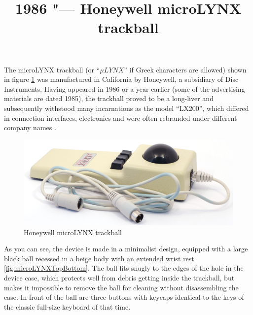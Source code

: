 \documentclass[11pt, a4paper]{article}
\begin{document}
\title{1986 "--- Honeywell microLYNX trackball}
\date{}
\maketitle
{}
The microLYNX trackball (or “$\mu LYNX$” if Greek characters are allowed) shown in figure \ref{fig:microLYNXPic} was manufactured in California by Honeywell, a subsidiary of Disc Instruments. Having appeared in 1986 or a year earlier (some of the advertising materials are dated 1985), the trackball proved to be a long-liver and subsequently withstood many incarnations as the model “LX200”, which differed in connection interfaces, electronics and were often rebranded under different company names \cite{lx200}.

\begin{figure}[h]
    \centering
    \includegraphics[scale=0.45]{1986_honeywell_microlynx_trackball/pic_30.jpg}
    \caption{Honeywell microLYNX trackball}
    \label{fig:microLYNXPic}
\end{figure}

As you can see, the device is made in a minimalist design, equipped with a large black ball recessed in a beige body with an extended wrist rest \ref{fig:microLYNXTopBottom}. The ball fits snugly to the edges of the hole in the device case, which protects well from debris getting inside the trackball, but makes it impossible to remove the ball for cleaning without disassembling the case. In front of the ball are three buttons with keycaps identical to the keys of the classic full-size keyboard of that time.
\end{document}
